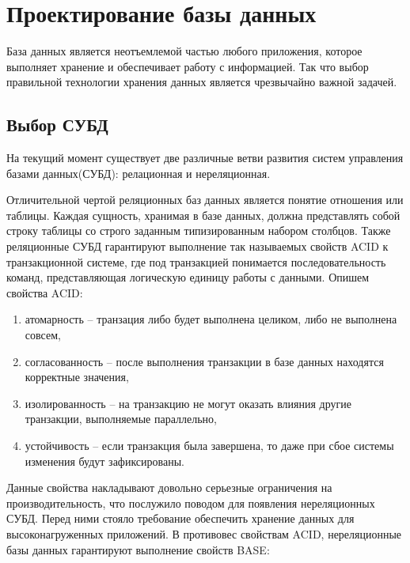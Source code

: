 \section*{Проектирование базы данных}

База данных является неотъемлемой частью любого приложения, которое выполняет
хранение и обеспечивает работу с информацией. Так что выбор правильной технологии
хранения данных является чрезвычайно важной задачей. 

\subsection*{Выбор СУБД}

На текущий момент существует две различные ветви развития систем управления
базами данных(СУБД): релационная и нереляционная.

Отличительной чертой реляционных баз данных является понятие отношения или таблицы.
Каждая сущность, хранимая в базе данных, должна представлять собой строку таблицы со 
строго заданным типизированным набором столбцов. Также реляционные СУБД гарантируют
выполнение так называемых свойств ACID к транзакционной системе, где под транзакцией
понимается последовательность команд, представляющая логическую единицу работы с данными.
Опишем свойства ACID: 

\begin{enumerate}
    \item атомарность -- транзация либо будет выполнена целиком, либо
        не выполнена совсем,
    \item согласованность -- после выполнения транзакции в базе данных
        находятся корректные значения,
    \item изолированность -- на транзакцию не могут оказать влияния другие транзакции,
        выполняемые параллельно,
    \item устойчивость -- если транзакция была завершена, то даже при сбое системы
        изменения будут зафиксированы.
\end{enumerate}

Данные свойства накладывают довольно серьезные ограничения на производительность, что
послужило поводом для появления нереляционных СУБД. Перед ними стояло требование
обеспечить хранение данных для высоконагруженных приложений. В противовес
свойствам ACID, нереляционные базы данных гарантируют выполнение свойств BASE\cite{GettingStartedWithNoSQL}:

